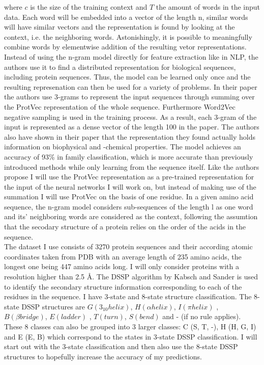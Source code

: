 \documentclass{article}
\begin{document}
where $c$ is the size of the training context and $T$ the amount of words in the input data. Each word will be embedded into a vector of the length n, similar words will have similar vectors and the representation is found by looking at the context, i.e. the neighboring words. Astonishingly, it is possible to meaningfully combine words by elementwise addition of the resulting vetor representations. 
Instead of using the n-gram model directly for feature extraction like in NLP, the authors use it to find a distributed representation for biological sequences, including protein sequences. Thus, the model can be learned only once and the resulting represenation can then be used for a variety of problems. In their paper the authors use 3-grams to represent the input sequences through summing over the ProtVec representation of the whole sequence. Furthermore Word2Vec negative sampling is used in the training process. As a result, each 3-gram of the input is represented as a dense vector of the length 100 in the paper. The authors also have shown in their paper that the representation they found actually holds information on biophysical and -chemical properties. The model achieves an accuracy of 93\% in family classification, which is more accurate than previously introduced methods while only learning from the sequence itself. Like the authors propose I will use the ProtVec representation as a pre-trained representation for the input of the neural networks I will work on, but instead of making use of the summation I will use ProtVec on the basis of one residue. 
In a given amino acid sequence, the n-gram model considers sub-sequences of the length l as one word and its' neighboring words are considered as the context, following the assumtion that the secodary structure of a protein relies on the order of the acids in the sequence.\\

The dataset I use consists of 3270 protein sequences and their according atomic coordinates taken from PDB with an average length of 235 amino acids, the longest one being 447 amino acids long. I will only consider proteins with a resolution higher than 2.5 Å. The DSSP algorithm by Kabsch and Sander is used to identify the secondary structure information corresponding to each of the residues in the sequence. I have 3-state and 8-state structure classification. The 8-state DSSP structures are $G (3_{10} helix)$, $H (\alpha helix)$, $I (\pi helix)$ , $B (\beta bridge)$, $E (ladder)$ , $T (turn)$, $S (bend)$ and - (if no rule applies). These 8 classes can also be grouped into 3 larger classes: C (S, T, -), H (H, G, I) and E (E, B) which correspond to the states in 3-state DSSP classification. I will start out with the 3-state classification and then also use the 8-state DSSP structures to hopefully increase the accuracy of my predictions.\\
\end{document}
